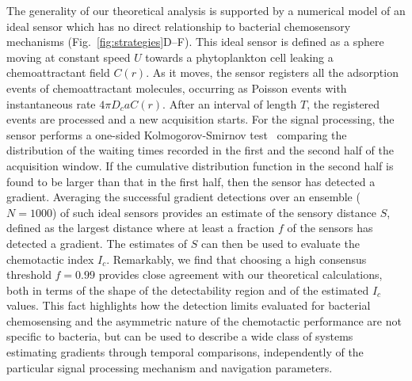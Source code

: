 \documentclass[9pt,twocolumn,twoside]{pnas-new}
\begin{document}
The generality of our theoretical analysis is supported by a numerical model of an ideal sensor which has no direct relationship 
to bacterial chemosensory mechanisms (Fig.~\ref{fig:strategies}D--F).
This ideal sensor is defined as a sphere moving at constant speed $U$ towards a phytoplankton cell leaking a chemoattractant field $C(r)$.
As it moves, the sensor registers all the adsorption events of chemoattractant molecules, occurring as Poisson events with instantaneous rate $4\pi D_c a C(r)$.
After an interval of length $T$, the registered events are processed and a new acquisition starts.
For the signal processing, the sensor performs a one-sided Kolmogorov-Smirnov test~\cite{massey1951kolmogorovsmirnov} comparing the distribution of the waiting times recorded in the first and the second half of the acquisition window.
If the cumulative distribution function in the second half is found to be larger than that in the first half, then the sensor has detected a gradient. Averaging the successful gradient detections over an ensemble ($N=1000$) 
of such ideal sensors provides an estimate of the sensory distance $S$, defined as the largest distance where at least a fraction $f$ of the sensors has detected a gradient. The estimates of $S$ can then be used to evaluate the chemotactic index $I_c$.
Remarkably, we find that choosing a high consensus threshold $f=0.99$ provides close agreement with our theoretical calculations, both in terms of the shape of the detectability region and of the estimated $I_c$ values.
This fact highlights how the detection limits evaluated for bacterial chemosensing and the asymmetric nature of the chemotactic performance are not specific to bacteria, but can be used to describe a wide class of systems estimating gradients through temporal comparisons, independently of the particular signal processing mechanism and navigation parameters.



\end{document}
